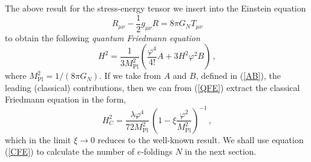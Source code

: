 \documentclass[aps,12pt,superscriptaddress,preprintnumbers,
                secnumarabic,nofootinbib,showpacs]{revtex4}
\begin{document}
The above result for the stress-energy tensor we insert into the Einstein
equation
\begin{equation}
R_{\mu\nu} -\frac12g_{\mu\nu}R = 8\pi G_N T_{\mu\nu}
\end{equation}
to obtain the following \textit{quantum Friedmann equation}
\begin{equation}
 H^2 = \frac{1}{3M_{\mathrm{Pl}}^2}\left(\frac{\varphi^4}{4!} A
+3H^2\varphi^2 B\right)
\,,
\label{QFE}
\end{equation}
where $M^2_{\mathrm{Pl}}= 1/(8\pi G_N)$. If we
take from $A$ and $B$, defined in ({\ref{AB}}), the leading
(classical) contributions, then we can from (\ref{QFE}) extract the
classical Friedmann equation in the form,
\begin{equation}
H^2_C =
\frac{\lambda\varphi^4}{72M^2_{\mathrm{Pl}}}\,\left(1-\xi\frac{\varphi^2}{M^2_{\mathrm{Pl}}}\right)^{-1}\,,
\label{CFE}
\end{equation}
which in the limit $\xi\rightarrow 0$ reduces to the well-known
result. We shall use equation (\ref{CFE}) to calculate the
number of $e$-foldings $N$ in the next section.
\end{document}

